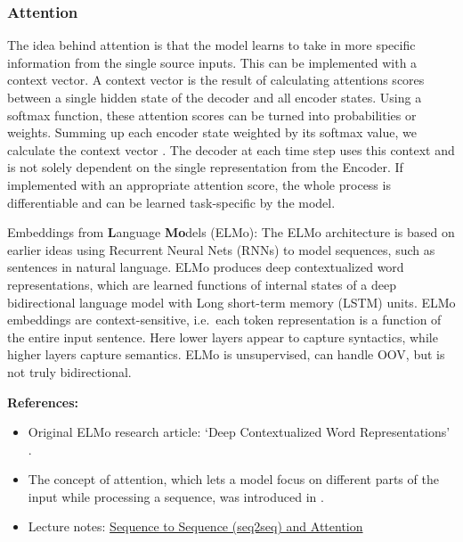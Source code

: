\documentclass[11pt, a4paper]{amsart}
\begin{document}
\subsubsection{Attention}

The idea behind attention is that the model learns to take in more specific information from the single source inputs. 
This can be implemented with a context vector. 
A context vector is the result of calculating attentions scores between a single hidden state of the decoder and all encoder states. 
Using a softmax function, these attention scores can be turned into probabilities or weights. 
Summing up each encoder state weighted by its softmax value, we calculate the context vector \cite{DBLP:journals/corr/BahdanauCB14}.
The decoder at each time step uses this context and is not solely dependent on the single representation from the Encoder. 
If implemented with an appropriate attention score, the whole process is differentiable and can be learned task-specific by the model.

{
	\color{blue}
	
	{E}mbeddings from \textbf{L}anguage \textbf{Mo}dels (ELMo):
	The ELMo architecture is based on earlier ideas using Recurrent Neural Nets (RNNs) to model sequences, such as sentences in natural language.
	ELMo produces deep contextualized word representations, which are learned functions of internal states of a deep bidirectional language model with Long short-term memory (LSTM) units.
	ELMo embeddings are context-sensitive, i.e.\ each token representation is a function of the entire input sentence.
	Here lower layers appear to capture syntactics, while higher layers capture semantics.
	ELMo is unsupervised, can handle OOV, but is not truly bidirectional.
} %

\noindent \textbf{References:}
\begin{itemize}
	\item {Original ELMo research article:} `Deep Contextualized Word Representations' \cite{DBLP:journals/corr/abs-1802-05365}.
	\item The concept of attention, which lets a model focus on different parts of the input while processing a sequence, was introduced in \cite{garg-etal-2019-jointly}.
	\item Lecture notes: \href{https://lena-voita.github.io/nlp_course/seq2seq_and_attention.html}{Sequence to Sequence (seq2seq) and Attention}
\end{itemize}

\end{document}
